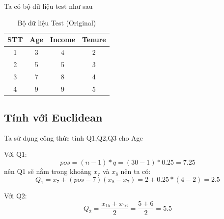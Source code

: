 \documentclass[12pt,a4paper]{article}
\begin{document}
Ta có bộ dữ liệu test như sau
\begin{table}[h]
\centering
\begin{tabular}{|c|c|c|c|}
\hline
\textbf{STT} & \textbf{Age} & \textbf{Income} & \textbf{Tenure} \\ \hline
1 & 3 & 4 & 2 \\ \hline
2 & 5 & 5 & 3 \\ \hline
3 & 7 & 8 & 4 \\ \hline
4 & 9 & 9 & 5 \\ \hline
\end{tabular}
\caption{Bộ dữ liệu Test (Original)}
\end{table}
\subsection{Tính với Euclidean}
Ta sử dụng công thức tính Q1,Q2,Q3 cho Age

Với Q1:
\[
pos=(n-1)*q=(30-1)*0.25=7.25
\] 
nên Q1 sẽ nằm trong khoảng $x_7$ và $x_8$ nên ta có:
\[
Q_1=x_7+(pos-7)(x_8-x_7)=2+0.25*(4-2)=2.5
\] 

Với Q2:
\[
Q_2=\frac{x_{15}+x_{16}}{2}=\frac{5+6}{2}=5.5
\] 
\end{document}
